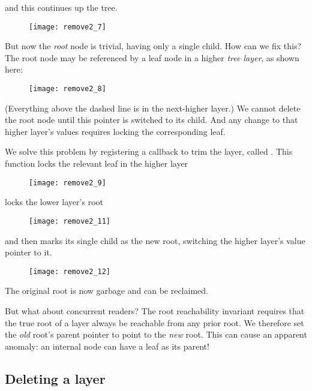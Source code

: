 \documentclass[11pt]{article}
\newcommand{\N}[1]{\text{\upshape{#1}}}
\begin{document}
\noindent%
and this continues
up the tree.

\begin{figure}[H]
\texttt{[image: remove2\_7]}
\end{figure}

\noindent%
But now the \emph{root} node is trivial, having only a single child. How
can we fix this? The root node may be referenced by
a leaf node in a higher \emph{tree layer}, as shown here:

\begin{figure}[H]
\texttt{[image: remove2\_8]}
\end{figure}

\noindent%
(Everything above the dashed line is in the next-higher layer.) We
cannot delete the root node until this pointer is switched to its child.
And any change to that higher layer's values requires locking the
corresponding leaf.

We solve this problem by registering a callback to trim the layer,
called \N{gclayer}. This function locks the
relevant leaf in the higher layer

\begin{figure}[H]
\texttt{[image: remove2\_9]}
\end{figure}

\noindent%
locks the lower layer's root

\begin{figure}[H]
\texttt{[image: remove2\_11]}
\end{figure}

\noindent%
and then marks its single child as the new root, switching the higher
layer's value pointer to it.

\begin{figure}[H]
\texttt{[image: remove2\_12]}
\end{figure}

The original root is now garbage and can be reclaimed.

But what about concurrent readers? The root reachability invariant
requires that the true root of a layer always be reachable from any
prior root. We therefore set the \emph{old} root's parent pointer to
point to the \emph{new} root. This can cause an apparent anomaly: an
internal node can have a leaf as its parent!

\subsection{Deleting a layer}
\end{document}
